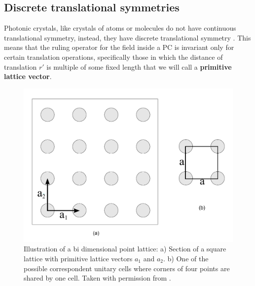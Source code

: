 \subsection{Discrete translational symmetries}
Photonic crystals, like crystals of atoms or molecules do not have continuous translational symmetry, instead, they have discrete translational symmetry \cite{Joannopoulos2008}. This means that the ruling operator for the field inside a PC is invariant only for certain translation operations, specifically those in which the distance of translation $r'$ is multiple of some fixed length that we will call a \textbf{primitive lattice vector}.

\begin{figure}
\centering
\includegraphics[scale=0.5]{./img/squarel.pdf}
\caption{Illustration of a bi dimensional point lattice: a) Section of a square lattice with primitive lattice vectors $a_1$ and $a_2$. b) One of the possible correspondent unitary cells where corners of four points are shared by one cell. Taken with permission from \cite{Guarin2012}.}
\label{fig:sq_lat_fig}
\end{figure}

